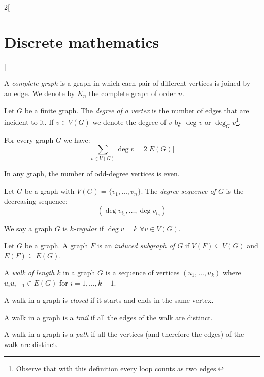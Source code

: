 \documentclass[../../../main.tex]{subfiles}
\begin{document}
\begin{multicols}{2}[\section{Discrete mathematics}]
  \begin{definition}
    A \textit{complete graph} is a graph in which each pair of different vertices is joined by an edge. We denote by $K_n$ the complete graph of order $n$.
  \end{definition}
  \begin{definition}
    Let $G$ be a finite graph. The \textit{degree of a vertex} is the number of edges that are incident to it. If $v\in V(G)$ we denote the degree of $v$ by $\deg v$ or $\deg_Gv$\footnote{Observe that with this definition every loop counts as two edges.}.
  \end{definition}
  \begin{lemma}
    For every graph $G$ we have: $$\sum_{v\in V(G)}\deg v=2|E(G)|$$
  \end{lemma}
  \begin{corollary}
    In any graph, the number of odd-degree vertices is even.
  \end{corollary}
  \begin{definition}
    Let $G$ be a graph with $V(G)=\{v_1,\ldots,v_n\}$. The \textit{degree sequence of $G$} is the decreasing sequence: $$(\deg v_{i_1},\ldots,\deg v_{i_n})$$
  \end{definition}
  \begin{definition}
    We say a graph $G$ is \textit{$k$-regular} if $\deg v=k$ $\forall v\in V(G)$.
  \end{definition}
  \begin{definition}
    Let $G$ be a graph. A graph $F$ is an \textit{induced subgraph of $G$} if $V(F)\subseteq V(G)$ and $E(F)\subseteq E(G)$.
  \end{definition}
  \begin{definition}
    A \textit{walk of length $k$} in a graph $G$ is a sequence of vertices $(u_1,\ldots,u_k)$ where $u_iu_{i+1}\in E(G)$ for $i=1,\ldots,k-1$.
  \end{definition}
  \begin{definition}
    A walk in a graph is \textit{closed} if it starts and ends in the same vertex.
  \end{definition}
  \begin{definition}
    A walk in a graph is a \textit{trail} if all the edges of the walk are distinct.
  \end{definition}
  \begin{definition}
    A walk in a graph is a \textit{path} if all the vertices (and therefore the edges) of the walk are distinct.
  \end{definition}

\end{multicols}
\end{document}
